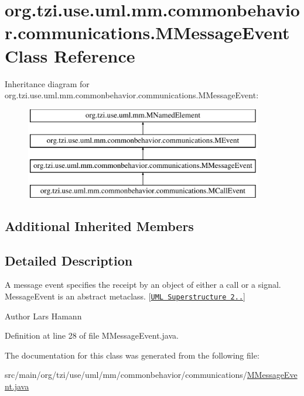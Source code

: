 \hypertarget{classorg_1_1tzi_1_1use_1_1uml_1_1mm_1_1commonbehavior_1_1communications_1_1_m_message_event}{\section{org.\-tzi.\-use.\-uml.\-mm.\-commonbehavior.\-communications.\-M\-Message\-Event Class Reference}
\label{classorg_1_1tzi_1_1use_1_1uml_1_1mm_1_1commonbehavior_1_1communications_1_1_m_message_event}
}
Inheritance diagram for org.\-tzi.\-use.\-uml.\-mm.\-commonbehavior.\-communications.\-M\-Message\-Event\-:\begin{figure}[H]
\begin{center}
\leavevmode
\includegraphics[height=4.000000cm]{classorg_1_1tzi_1_1use_1_1uml_1_1mm_1_1commonbehavior_1_1communications_1_1_m_message_event}
\end{center}
\end{figure}
\subsection*{Additional Inherited Members}


\subsection{Detailed Description}
A message event specifies the receipt by an object of either a call or a signal. Message\-Event is an abstract metaclass. \mbox{[}\href{http://www.omg.org/spec/UML/}{\tt U\-M\-L Superstructure 2..}\mbox{]} \begin{DoxyAuthor}{Author}
Lars Hamann 
\end{DoxyAuthor}


Definition at line 28 of file M\-Message\-Event.\-java.



The documentation for this class was generated from the following file\-:\begin{DoxyCompactItemize}
\item 
src/main/org/tzi/use/uml/mm/commonbehavior/communications/\hyperlink{_m_message_event_8java}{M\-Message\-Event.\-java}\end{DoxyCompactItemize}
